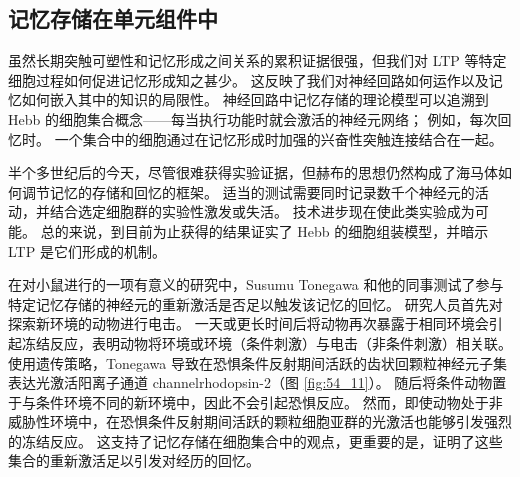 \subsection{记忆存储在单元组件中}

虽然长期突触可塑性和记忆形成之间关系的累积证据很强，但我们对 LTP 等特定细胞过程如何促进记忆形成知之甚少。
这反映了我们对神经回路如何运作以及记忆如何嵌入其中的知识的局限性。
神经回路中记忆存储的理论模型可以追溯到 Hebb 的细胞集合概念——每当执行功能时就会激活的神经元网络；
例如，每次回忆时。
一个集合中的细胞通过在记忆形成时加强的兴奋性突触连接结合在一起。


半个多世纪后的今天，尽管很难获得实验证据，但赫布的思想仍然构成了海马体如何调节记忆的存储和回忆的框架。
适当的测试需要同时记录数千个神经元的活动，并结合选定细胞群的实验性激发或失活。
技术进步现在使此类实验成为可能。
总的来说，到目前为止获得的结果证实了 Hebb 的细胞组装模型，并暗示 LTP 是它们形成的机制。


在对小鼠进行的一项有意义的研究中，Susumu Tonegawa 和他的同事测试了参与特定记忆存储的神经元的重新激活是否足以触发该记忆的回忆。
研究人员首先对探索新环境的动物进行电击。
一天或更长时间后将动物再次暴露于相同环境会引起冻结反应，表明动物将环境或环境（条件刺激）与电击（非条件刺激）相关联。
使用遗传策略，Tonegawa 导致在恐惧条件反射期间活跃的齿状回颗粒神经元子集表达光激活阳离子通道 channelrhodopsin-2（图 \ref{fig:54_11}）。
随后将条件动物置于与条件环境不同的新环境中，因此不会引起恐惧反应。
然而，即使动物处于非威胁性环境中，在恐惧条件反射期间活跃的颗粒细胞亚群的光激活也能够引发强烈的冻结反应。
这支持了记忆存储在细胞集合中的观点，更重要的是，证明了这些集合的重新激活足以引发对经历的回忆。


